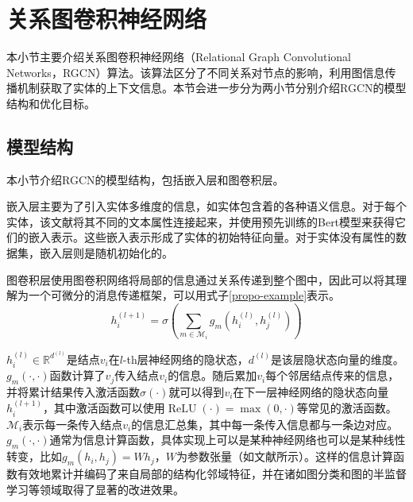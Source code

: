 


\section{关系图卷积神经网络}\label{RGCN}
本小节主要介绍关系图卷积神经网络（Relational Graph Convolutional Networks，RGCN）算法\cite{schlichtkrull2018modeling}。该算法区分了不同关系对节点的影响，利用图信息传播机制获取了实体的上下文信息。本节会进一步分为两小节分别介绍RGCN的模型结构和优化目标。
\subsection{模型结构}
本小节介绍RGCN的模型结构，包括嵌入层和图卷积层。

嵌入层主要为了引入实体多维度的信息，如实体包含着的各种语义信息。对于每个实体，该文献将其不同的文本属性连接起来，并使用预先训练的Bert\cite{devlin2018bert}模型来获得它们的嵌入表示。这些嵌入表示形成了实体的初始特征向量。对于实体没有属性的数据集，嵌入层则是随机初始化的。

图卷积层使用图卷积网络将局部的信息通过关系传递到整个图中，因此可以将其理解为一个可微分的消息传递框架，可以用式子\ref{propo-example}表示。
\begin{equation}
    h_{i}^{(l+1)}=\sigma\left(\sum_{m \in \mathcal{M}_{i}} g_{m}\left(h_{i}^{(l)}, h_{j}^{(l)}\right)\right)
    \label{propo-example}
\end{equation}

$h_{i}^{(l)} \in \mathbb{R}^{d^{(l)}}$是结点$v_{i}$在$l$-th层神经网络的隐状态，$d^{(l)}$是该层隐状态向量的维度。$g_{m}(\cdot, \cdot)$函数计算了$v_{j}$传入结点$v_{i}$的信息。随后累加$v_{i}$每个邻居结点传来的信息，并将累计结果传入激活函数$\sigma(\cdot)$就可以得到$v_{i}$在下一层神经网络的隐状态向量$h_{i}^{(l+1)}$，其中激活函数可以使用$\operatorname{ReLU}(\cdot)=\max (0, \cdot)$等常见的激活函数。$\mathcal{M}_{i}$表示每一条传入结点$v_{i}$的信息汇总集，其中每一条传入信息都与一条边对应。$g_{m}(\cdot, \cdot)$通常为信息计算函数，具体实现上可以是某种神经网络也可以是某种线性转变，比如$g_{m}\left(h_{i}, h_{j}\right)=W h_{j}$，$W$为参数张量（如文献\parencite{kipf2016semi}所示）。这样的信息计算函数有效地累计并编码了来自局部的结构化邻域特征，并在诸如图分类\cite{duvenaud2015convolutional}和图的半监督学习等领域取得了显著的改进效果。

